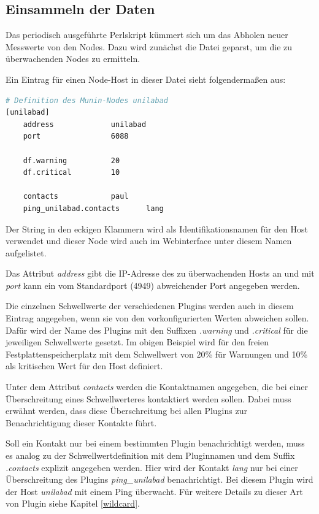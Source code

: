 \subsection{Einsammeln der Daten}
Das periodisch ausgeführte Perlskript  kümmert sich um das Abholen neuer Messwerte von den Nodes.
Dazu wird zunächst die Datei  geparst, um die zu überwachenden Nodes zu ermitteln.

Ein Eintrag für einen Node-Host in dieser Datei sieht folgendermaßen aus:


\begin{lstlisting}[captionpos=b, caption=Beispielhafte Definition eines Munin-Nodes, label=nodedef, breaklines = true, language=bash]
# Definition des Munin-Nodes unilabad
[unilabad]
	address 			unilabad
	port				6088
	
	df.warning			20
	df.critical			10
	
	contacts			paul
	ping_unilabad.contacts		lang
\end{lstlisting}

Der String in den eckigen Klammern wird als Identifikationsnamen für den Host verwendet und dieser Node wird auch im Webinterface unter diesem Namen aufgelistet.

Das Attribut \textit{address} gibt die IP-Adresse des zu überwachenden Hosts an und mit \textit{port} kann ein vom Standardport (4949) abweichender Port angegeben werden.

Die einzelnen Schwellwerte der verschiedenen Plugins werden auch in diesem Eintrag angegeben, wenn sie von den vorkonfigurierten Werten abweichen sollen.
Dafür wird der Name des Plugins mit den Suffixen \textit{.warning} und \textit{.critical} für die jeweiligen Schwellwerte gesetzt.
Im obigen Beispiel wird  für den freien Festplattenspeicherplatz mit dem Schwellwert von 20\% für Warnungen und 10\% als kritischen Wert für den Host definiert.

Unter dem Attribut \textit{contacts} werden die Kontaktnamen angegeben, die bei einer Überschreitung eines Schwellwerteres kontaktiert werden sollen.
Dabei muss erwähnt werden, dass diese Überschreitung bei allen Plugins zur Benachrichtigung dieser Kontakte führt.

Soll ein Kontakt nur bei einem bestimmten Plugin benachrichtigt werden, muss es analog zu der Schwellwertdefinition mit dem Pluginnamen und dem Suffix \textit{.contacts} explizit angegeben werden. Hier wird der Kontakt \textit{lang} nur bei einer Überschreitung des Plugins \textit{ping\_unilabad} benachrichtigt.
Bei diesem Plugin wird der Host \textit{unilabad} mit einem Ping überwacht.
Für weitere Details zu dieser Art von Plugin siehe Kapitel \ref{wildcard}.

